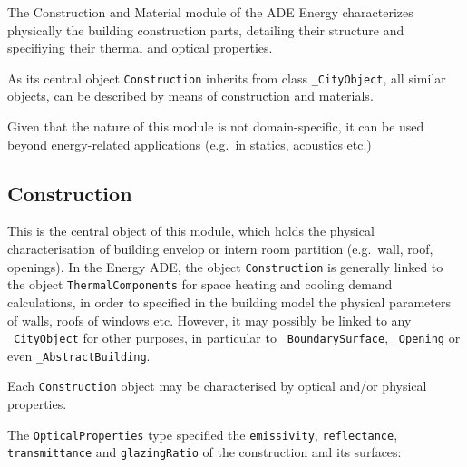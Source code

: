 \documentclass[a4paper,12pt]{article}
\begin{document}
The Construction and Material module of the ADE Energy characterizes
physically the building construction parts, detailing their structure
and specifiying their thermal and optical properties.

As its central object \lstinline!Construction! inherits from class
\lstinline!_CityObject!, all similar objects, can be described by means
of construction and materials.

Given that the nature of this module is not domain-specific, it can be
used beyond energy-related applications (e.g.~in statics, acoustics
etc.)

\subsection{Construction}\label{construction}

This is the central object of this module, which holds the physical
characterisation of building envelop or intern room partition
(e.g.~wall, roof, openings). In the Energy ADE, the object
\lstinline!Construction! is generally linked to the object
\lstinline!ThermalComponents! for space heating and cooling demand
calculations, in order to specified in the building model the physical
parameters of walls, roofs of windows etc. However, it may possibly be
linked to any \lstinline!_CityObject! for other purposes, in particular
to \lstinline!_BoundarySurface!, \lstinline!_Opening! or even
\lstinline!_AbstractBuilding!.

Each \lstinline!Construction! object may be characterised by optical
and/or physical properties.

The \lstinline!OpticalProperties! type specified the
\lstinline!emissivity!, \lstinline!reflectance!,
\lstinline!transmittance! and \lstinline!glazingRatio! of the
construction and its surfaces:
\end{document}
